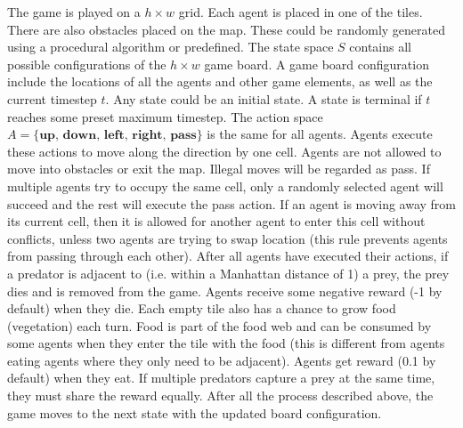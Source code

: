 \documentclass[]{interact}
\theoremstyle{plain}%
\theoremstyle{definition}
\theoremstyle{remark}
\begin{document}
The game is played on a $h \times w$ grid. Each agent is placed in one of the tiles. There are also obstacles placed on the map. These could be randomly generated using a procedural algorithm or predefined. The state space $S$ contains all possible configurations of the $h \times w$ game board. A game board configuration include the locations of all the agents and other game elements, as well as the current timestep $t$. Any state could be an initial state. A state is terminal if $t$ reaches some preset maximum timestep. The action space $A = \{\textbf{up, down, left, right, pass}\}$ is the same for all agents. Agents execute these actions to move along the direction by one cell. Agents are not allowed to move into obstacles or exit the map. Illegal moves will be regarded as pass. If multiple agents try to occupy the same cell, only a randomly selected agent will succeed and the rest will execute the pass action. If an agent is moving away from its current cell, then it is allowed for another agent to enter this cell without conflicts, unless two agents are trying to swap location (this rule prevents agents from passing through each other). After all agents have executed their actions, if a predator is adjacent to (i.e. within a Manhattan distance of 1) a prey, the prey dies and is removed from the game. Agents receive some negative reward (-1 by default) when they die. Each empty tile also has a chance to grow food (vegetation) each turn. Food is part of the food web and can be consumed by some agents when they enter the tile with the food (this is different from agents eating agents where they only need to be adjacent). Agents get reward (0.1 by default) when they eat. If multiple predators capture a prey at the same time, they must share the reward equally. After all the process described above, the game moves to the next state with the updated board configuration.
\end{document}
